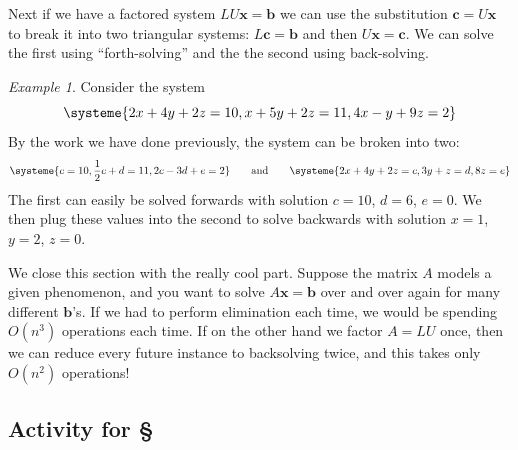 \documentclass[11pt,oneside]{amsbook}
\theoremstyle{definition}
\theoremstyle{plain}
\theoremstyle{definition}
\theoremstyle{remark}
\newtheorem{example}[theorem]{Example}
\numberwithin{equation}{section}
\numberwithin{figure}{section}
\begin{document}
Next if we have a factored system $LU\mathbf{x}=\mathbf{b}$ we can use the substitution $\mathbf{c}=U\mathbf{x}$ to break it into two triangular systems: $L\mathbf{c}=\mathbf{b}$ and then $U\mathbf{x}=\mathbf{c}$. We can solve the first using ``forth-solving'' and the the second using back-solving.

\begin{example}
  Consider the system
  \[\systeme{2x+4y+2z=10,x+5y+2z=11,4x-y+9z=2}
  \]
  By the work we have done previously, the system can be broken into two:
  \[\systeme{c=10,\frac12c+d=11,2c-3d+e=2}
    \qquad\text{and}\qquad
    \systeme{2x+4y+2z=c,3y+z=d,8z=e}
  \]
  The first can easily be solved forwards with solution $c=10$, $d=6$, $e=0$. We then plug these values into the second to solve backwards with solution $x=1$, $y=2$, $z=0$.
\end{example}

We close this section with the really cool part. Suppose the matrix $A$ models a given phenomenon, and you want to solve $A\mathbf{x}=\mathbf{b}$ over and over again for many different $\mathbf{b}$'s. If we had to perform elimination each time, we would be spending $O(n^3)$ operations each time. If on the other hand we factor $A=LU$ once, then we can reduce every future instance to backsolving twice, and this takes only $O(n^2)$ operations!

\newpage
\subsection*{Activity for \S \thesection}
\end{document}
